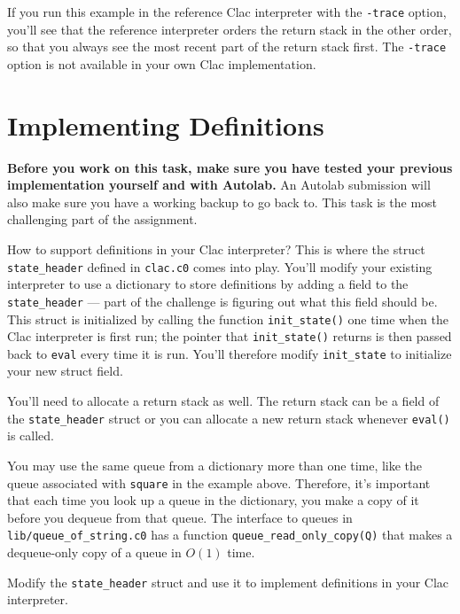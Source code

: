 \documentclass[12pt]{exam}
\begin{document}
If you run this example in the reference Clac interpreter with the
\lstinline'-trace' option, you'll see that the reference interpreter orders
the return stack in the other order, so that you always see the most
recent part of the return stack first.  The \lstinline'-trace' option
is not available in your own Clac implementation.


\clearpage
\section{Implementing Definitions}

\textbf{Before you work on this task, make sure you have tested your
  previous implementation yourself and with Autolab.} An Autolab
submission will also make sure you have a working backup to go back
to.  This task is the most challenging part of the assignment.

How to support definitions in your Clac interpreter?  This is where
the struct \lstinline'state_header' defined in \lstinline'clac.c0'
comes into play.  You'll modify your existing interpreter to use a
dictionary to store definitions by adding a field to the
\lstinline'state_header' --- part of the challenge is figuring out
what this field should be.  This struct is initialized by calling the
function \lstinline'init_state()' one time when the Clac interpreter
is first run; the pointer that \lstinline'init_state()' returns is
then passed back to \lstinline'eval' every time it is run.  You'll
therefore modify \lstinline'init_state' to initialize your new struct
field.

You'll need to allocate a return stack as well. The return stack can
be a field of the \lstinline'state_header' struct or you can allocate a new
return stack whenever \lstinline'eval()' is called.

You may use the same queue from a dictionary more than one time,
like the queue associated with \lstinline'square' in the example
above.  Therefore, it's important that each time you look up a queue
in the dictionary, you make a copy of it before you dequeue from that
queue.  The interface to queues in \lstinline'lib/queue_of_string.c0'
has a function \lstinline'queue_read_only_copy(Q)' that makes a
dequeue-only copy of a queue in $O(1)$ time.

\begin{task}[6]
Modify the \lstinline'state_header' struct and use it to
implement definitions in your Clac interpreter.
\end{task}
\end{document}
